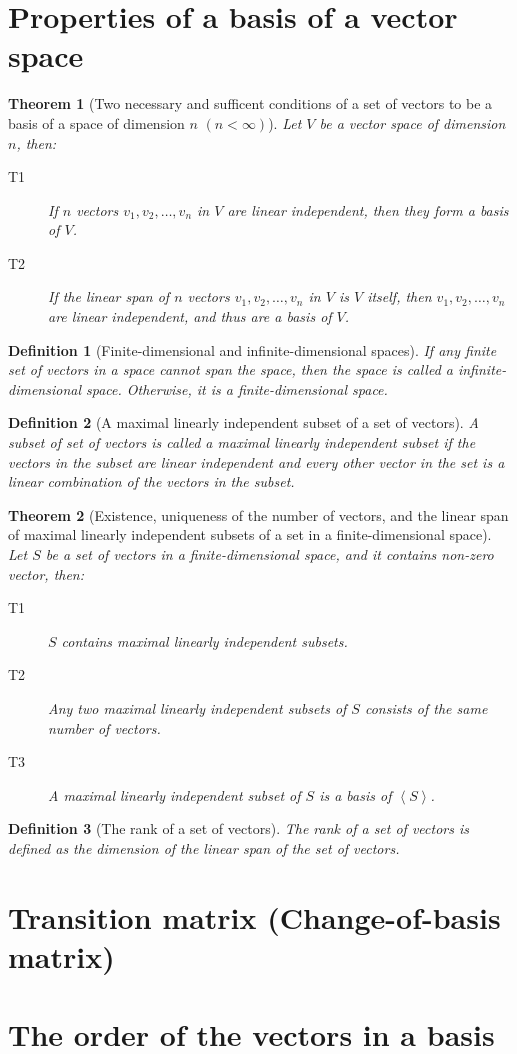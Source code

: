 \documentclass[onecolumn]{ctexart}
\newtheorem{definition}{Definition}
\newtheorem{theorem}{Theorem}
\begin{document}
\section{Properties of a basis of a vector space}

\begin{theorem}[Two necessary and sufficent conditions of a set of vectors to be a basis of a space of dimension $n$ $(n < \infty)$]
  Let $V$ be a vector space of dimension $n$, then:
  \begin{description}
    \item[T1] If $n$ vectors $v_1, v_2, \ldots, v_n$ in $V$ are linear independent, then they form a basis of $V$.
    \item[T2] If the linear span of $n$ vectors $v_1, v_2, \ldots, v_n$ in $V$ is $V$ itself, then $v_1, v_2, \ldots, v_n$ are linear independent, and thus are a basis of $V$.
  \end{description}
\end{theorem}

\begin{definition}[Finite-dimensional and infinite-dimensional spaces]
  If any finite set of vectors in a space cannot span the space, then the space is called a infinite-dimensional space. Otherwise, it is a finite-dimensional space.
\end{definition}

\begin{definition}[A maximal linearly independent subset of a set of vectors]
  A subset of set of vectors is called a maximal linearly independent subset if the vectors in the subset are linear independent and every other vector in the set is a linear combination of the vectors in the subset.
\end{definition}

\begin{theorem}[Existence, uniqueness of the number of vectors, and the linear span of maximal linearly independent subsets of a set in a finite-dimensional space]
  Let $S$ be a set of vectors in a finite-dimensional space, and it contains non-zero vector, then:
  \begin{description}
    \item[T1] $S$ contains maximal linearly independent subsets.
    \item[T2] Any two maximal linearly independent subsets of $S$ consists of the same number of vectors.
    \item[T3] A maximal linearly independent subset of $S$ is a basis of $\left\langle S \right\rangle $.
  \end{description}
\end{theorem}

\begin{definition}[The rank of a set of vectors]
  The rank of a set of vectors is defined as the dimension of the linear span of the set of vectors.
\end{definition}

\section{Transition matrix (Change-of-basis matrix)}

\section{The order of the vectors in a basis}
\end{document}
